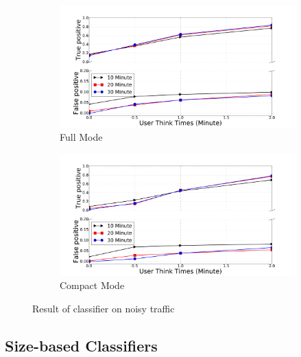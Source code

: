  \begin{figure}[!t]
\begin{subfigure}{.48\linewidth}
\centering
\includegraphics[width=\linewidth]{image/jan25/full_d2u.pdf}
\caption{Full Mode}
\label{fig:tp}
\end{subfigure}
\centering
\begin{subfigure}{.48\linewidth}
\includegraphics[width=\linewidth]{image/jan25/cmp_d2u.pdf}
\caption{Compact Mode}
\label{fig:fp}
\end{subfigure}
\caption{Result of  classifier on noisy \bc traffic}
\label{fig:d2u}
\end{figure}

\subsection{Size-based Classifiers}


